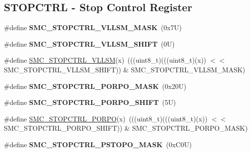 \subsection*{S\+T\+O\+P\+C\+T\+RL -\/ Stop Control Register}
\begin{DoxyCompactItemize}
\item 
\mbox{\label{group___s_m_c___register___masks_ga3136f47b42d64148e5d163e5df6fc661}} 
\#define {\bfseries S\+M\+C\+\_\+\+S\+T\+O\+P\+C\+T\+R\+L\+\_\+\+V\+L\+L\+S\+M\+\_\+\+M\+A\+SK}~(0x7\+U)
\item 
\mbox{\label{group___s_m_c___register___masks_gadcd933de05a733bb58e1bfdeba6c653b}} 
\#define {\bfseries S\+M\+C\+\_\+\+S\+T\+O\+P\+C\+T\+R\+L\+\_\+\+V\+L\+L\+S\+M\+\_\+\+S\+H\+I\+FT}~(0\+U)
\item 
\#define \mbox{\hyperlink{group___s_m_c___register___masks_gaab1f5f66e78683bda4b4a8c48f3c753d}{S\+M\+C\+\_\+\+S\+T\+O\+P\+C\+T\+R\+L\+\_\+\+V\+L\+L\+SM}}(x)~(((uint8\+\_\+t)(((uint8\+\_\+t)(x)) $<$$<$ S\+M\+C\+\_\+\+S\+T\+O\+P\+C\+T\+R\+L\+\_\+\+V\+L\+L\+S\+M\+\_\+\+S\+H\+I\+FT)) \& S\+M\+C\+\_\+\+S\+T\+O\+P\+C\+T\+R\+L\+\_\+\+V\+L\+L\+S\+M\+\_\+\+M\+A\+SK)
\item 
\mbox{\label{group___s_m_c___register___masks_ga686e24e6e009e5066a1325f159c603bd}} 
\#define {\bfseries S\+M\+C\+\_\+\+S\+T\+O\+P\+C\+T\+R\+L\+\_\+\+P\+O\+R\+P\+O\+\_\+\+M\+A\+SK}~(0x20\+U)
\item 
\mbox{\label{group___s_m_c___register___masks_ga36eb36236efe97e99984cfc2e6f215be}} 
\#define {\bfseries S\+M\+C\+\_\+\+S\+T\+O\+P\+C\+T\+R\+L\+\_\+\+P\+O\+R\+P\+O\+\_\+\+S\+H\+I\+FT}~(5\+U)
\item 
\#define \mbox{\hyperlink{group___s_m_c___register___masks_gaac6a41dda8ce84c5d1c5b7d4513e3e4c}{S\+M\+C\+\_\+\+S\+T\+O\+P\+C\+T\+R\+L\+\_\+\+P\+O\+R\+PO}}(x)~(((uint8\+\_\+t)(((uint8\+\_\+t)(x)) $<$$<$ S\+M\+C\+\_\+\+S\+T\+O\+P\+C\+T\+R\+L\+\_\+\+P\+O\+R\+P\+O\+\_\+\+S\+H\+I\+FT)) \& S\+M\+C\+\_\+\+S\+T\+O\+P\+C\+T\+R\+L\+\_\+\+P\+O\+R\+P\+O\+\_\+\+M\+A\+SK)
\item 
\mbox{\label{group___s_m_c___register___masks_ga8495d4f93210f68516438215c68c9b80}} 
\#define {\bfseries S\+M\+C\+\_\+\+S\+T\+O\+P\+C\+T\+R\+L\+\_\+\+P\+S\+T\+O\+P\+O\+\_\+\+M\+A\+SK}~(0x\+C0\+U)

\end{DoxyCompactItemize}

